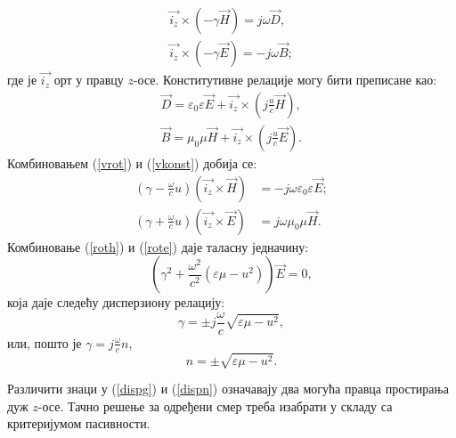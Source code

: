 \begin{equation}\label{vrot}
\begin{split}
\vec{i_z}\times \left( -\gamma\vec{H} \right) = j\omega\vec{D},\\
\vec{i_z}\times \left( -\gamma\vec{E} \right) = -j\omega\vec{B};
\end{split}
\end{equation}
где је $\vec{i_z}$ орт у правцу $z$-осе. Конститутивне релације могу бити преписане као:
\begin{equation}\label{vkonst}
\begin{split}
\vec{D} = \varepsilon_0\varepsilon \vec{E} + \vec{i_z}\times \left( j\frac{u}{c}\vec{H} \right),\\
\vec{B} = \mu_0\mu \vec{H} + \vec{i_z}\times \left( j\frac{u}{c}\vec{E} \right).
\end{split}
\end{equation}
Комбиновањем (\ref{vrot}) и (\ref{vkonst}) добија се:
\begin{align}
(\gamma - \frac{\omega}{c} u)\left( \vec{i_z}\times\vec{H} \right) &= -j\omega\varepsilon_0\varepsilon\vec{E};\label{roth}\\
(\gamma + \frac{\omega}{c} u)\left( \vec{i_z}\times\vec{E} \right) &= j\omega\mu_0\mu\vec{H}.\label{rote}
\end{align}
Комбиновање (\ref{roth}) и (\ref{rote}) даје таласну једначину:
\begin{equation}
\left(\gamma^2+\frac{\omega^2}{c^2}\left(\varepsilon\mu -u^2\right)\right)\vec{E}=0,
\end{equation}
која даје следећу дисперзиону релацију:
\begin{equation}\label{dispg}
\gamma=\pm j\frac{\omega}{c}\sqrt{\varepsilon\mu - u^2},
\end{equation}
или, пошто је $\gamma=j\frac{\omega}{c}n$,
\begin{equation}\label{dispn}
n = \pm \sqrt{\varepsilon\mu - u^2}.
\end{equation}

Различити знаци у (\ref{dispg}) и (\ref{dispn}) означавају два могућа правца простирања дуж  $z$-осе. Тачно решење за одређени смер треба изабрати у складу са критеријумом пасивности.


